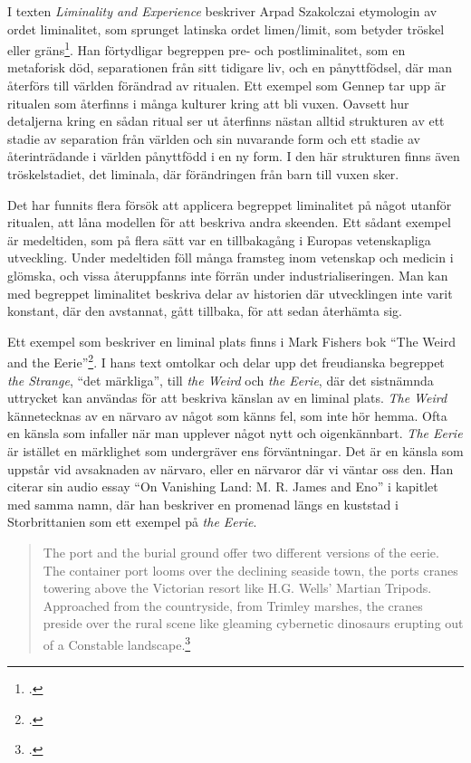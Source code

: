 \documentclass{article}
\begin{document}
I texten \emph{Liminality and Experience} beskriver Arpad Szakolczai etymologin av ordet liminalitet, som
sprunget latinska ordet limen/limit, som betyder tröskel eller gräns\footcite[147-148]{Arpad}. 
Han förtydligar begreppen pre- och postliminalitet,
som en metaforisk död, separationen från sitt tidigare liv, och en pånyttfödsel, där man återförs till världen
förändrad av ritualen. Ett exempel som Gennep tar upp är ritualen som återfinns i många kulturer kring att bli
vuxen. Oavsett hur detaljerna kring en sådan ritual ser ut återfinns nästan alltid strukturen av ett stadie av
separation från världen och sin nuvarande form och ett stadie av återinträdande i världen pånyttfödd i en ny
form. I den här strukturen finns även tröskelstadiet, det liminala, där förändringen från barn till vuxen
sker. 

Det har funnits flera försök att applicera begreppet liminalitet på något utanför ritualen, att låna modellen
för att beskriva andra skeenden. Ett sådant exempel är medeltiden, som på flera sätt var en tillbakagång i
Europas vetenskapliga utveckling. Under medeltiden föll många framsteg inom vetenskap och medicin i glömska,
och vissa återuppfanns inte förrän under industrialiseringen. Man kan med begreppet liminalitet beskriva delar
av historien där utvecklingen inte varit konstant, där den avstannat, gått tillbaka, för att sedan återhämta
sig. 

Ett exempel som beskriver en liminal plats finns i Mark Fishers bok ``The Weird and the
Eerie''\footcite{Fisher}. I hans text
omtolkar och delar upp det freudianska begreppet \emph{the Strange}, ``det märkliga'', till \emph{the
Weird} och \emph{the Eerie}, där det sistnämnda uttrycket kan användas för att beskriva känslan av en liminal plats. 
\emph{The Weird} kännetecknas av en närvaro av något som känns fel, som inte hör hemma. Ofta en känsla som
infaller när man upplever något nytt och oigenkännbart. \emph{The Eerie} är istället en märklighet som undergräver ens
förväntningar. Det är en känsla som uppstår vid avsaknaden av närvaro, eller en närvaror där vi väntar oss
den. Han citerar sin audio essay ``On Vanishing Land: M. R. James and Eno'' i kapitlet med samma namn, där han beskriver en
promenad längs en kuststad i Storbrittanien som ett exempel på \emph{the Eerie}.

\begin{quote}
The port and the burial ground offer two different versions of the eerie. The container port looms over the
declining seaside town, the ports cranes towering above the Victorian resort like H.G. Wells' Martian Tripods.
Approached from the countryside, from Trimley marshes, the cranes preside over the rural scene like gleaming
	cybernetic dinosaurs erupting out of a Constable landscape.\footcite[76]{Fisher}
\end{quote}
\end{document}
